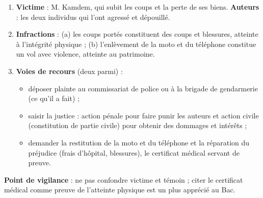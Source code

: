 \documentclass[11pt]{article}
\newcommand{\cle}[1]{{\popxbold\color{popdark}#1}}
\begin{document}
\begin{corrige}
\begin{enumerate}
\item \textbf{Victime} : M. Kamdem, qui subit les coups et la perte de ses biens. \textbf{Auteurs} : les deux individus qui l'ont agressé et dépouillé.
\item \textbf{Infractions} : (a) les coups portés constituent des \cle{coups et blessures}, atteinte à l'intégrité \cle{physique} ; (b) l'enlèvement de la moto et du téléphone constitue un \cle{vol} avec violence, atteinte au \cle{patrimoine}.
\item \textbf{Voies de recours} (deux parmi) :
\begin{itemize}
\item déposer plainte au commissariat de police ou à la brigade de gendarmerie (ce qu'il a fait) ;
\item saisir la justice : action pénale pour faire punir les auteurs et action civile (constitution de partie civile) pour obtenir des dommages et intérêts ;
\item demander la restitution de la moto et du téléphone et la réparation du préjudice (frais d'hôpital, blessures), le certificat médical servant de preuve.
\end{itemize}
\end{enumerate}
\textbf{Point de vigilance} : ne pas confondre victime et témoin ; citer le certificat médical comme preuve de l'atteinte physique est un plus apprécié au Bac.
\end{corrige}
\end{document}
